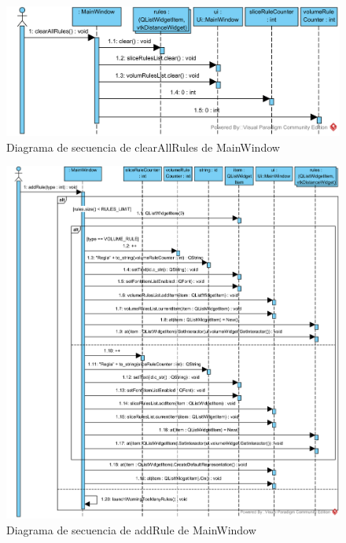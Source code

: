 \begin{figure}[H]
	\centering
	\includegraphics[width=12cm]{imagenes/diagramas/secuencia/MainWindow_ClearAllRules}
	\caption{Diagrama de secuencia de clearAllRules de MainWindow}
	\label{fig:diagrama_secuencia_mainWindow_clearAllRules}
\end{figure}

\begin{figure}[H]
	\centering
	\includegraphics[width=12cm]{imagenes/diagramas/secuencia/MainWindow_AddRule}
	\caption{Diagrama de secuencia de addRule de MainWindow}
	\label{fig:diagrama_secuencia_mainWindow_addRule}
\end{figure}

